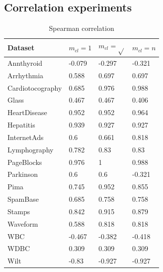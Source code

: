 \documentclass[11pt]{article}
\begin{document}
{\subsection{Correlation experiments}\label{sec:cor}
\begin{table}[h!]
\centering
\caption{Spearman correlation}
\label{tab:cor}
\begin{tabular}{llll}
\hline
Dataset 	& $m_{cl} = 1$ & $m_{cl} = \sqrt{}$ & $m_{cl} = n$  \\ \hline
Annthyroid &  -0.079 &  -0.297 &  -0.321  \\
Arrhythmia &  0.588 &  0.697 &  0.697  \\ 
Cardiotocography &  0.685 &  0.976 &  0.988  \\ 
Glass &  0.467 &  0.467 &  0.406  \\ 
HeartDisease &  0.952 &  0.952 &  0.964  \\ 
Hepatitis &  0.939 &  0.927 &  0.927  \\ 
InternetAds &  0.6 &  0.661 &  0.818  \\ 
Lymphography &  0.782 &  0.83 &  0.83  \\ 
PageBlocks &  0.976 &  1 &  0.988  \\ 
Parkinson &  0.6 &  0.6 &  -0.321  \\ 
Pima &  0.745 &  0.952 &  0.855  \\ 
SpamBase &  0.685 &  0.758 &  0.758  \\ 
Stamps &  0.842 &  0.915 &  0.879  \\ 
Waveform &  0.588 &  0.818 &  0.818  \\ 
WBC &  -0.467 &  -0.382 &  -0.418  \\ 
WDBC &  0.309 &  0.309 &  0.309  \\ 
Wilt &  -0.83 &  -0.927 &  -0.927  \\  \bottomrule
\end{tabular}
\end{table}

}
\end{document}
